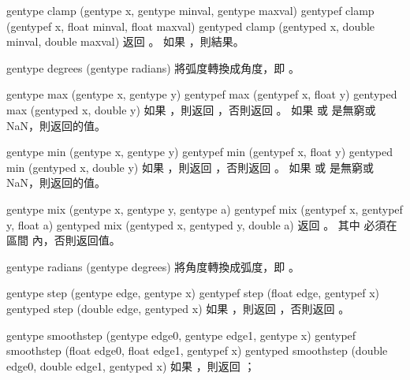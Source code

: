 gentype clamp (gentype x,
		gentype minval,
		gentype maxval)
gentypef clamp (gentypef x,
		float minval,
		float maxval)
gentyped clamp (gentyped x,
		double minval,
		double maxval)
\stopbuffer
{}
返回 。
如果 ，則結果。
\stopbuffer

gentype degrees (gentype radians)
\stopbuffer
{}
將弧度轉換成角度，即 。
\stopbuffer

gentype max (gentype x, gentype y)
gentypef max (gentypef x, float y)
gentyped max (gentyped x, double y)
\stopbuffer
{}
如果 ，則返回 ，否則返回 。
如果  或  是無窮或 NaN，則返回的值。
\stopbuffer

gentype min (gentype x, gentype y)
gentypef min (gentypef x, float y)
gentyped min (gentyped x, double y)
\stopbuffer
{}
如果 ，則返回 ，否則返回 。
如果  或  是無窮或 NaN，則返回的值。
\stopbuffer

gentype mix (gentype x,
		gentype y,
		gentype a)
gentypef mix (gentypef x,
		gentypef y,
		float a)
gentyped mix (gentyped x,
		gentyped y,
		double a)
\stopbuffer
{}
返回 。
其中  必須在區間  內，否則返回值。
\stopbuffer

gentype radians (gentype degrees)
\stopbuffer
{}
將角度轉換成弧度，即 。
\stopbuffer

gentype step (gentype edge,
		gentype x)
gentypef step (float edge,
		gentypef x)
gentyped step (double edge,
		gentyped x)
\stopbuffer
{}
如果 ，則返回 ，否則返回 。
\stopbuffer

gentype smoothstep (gentype edge0,
		gentype edge1,
		gentype x)
gentypef smoothstep (float edge0,
		float edge1,
		gentypef x)
gentyped smoothstep (double edge0,
		double edge1,
		gentyped x)
\stopbuffer
{}
如果 ，則返回 ；

